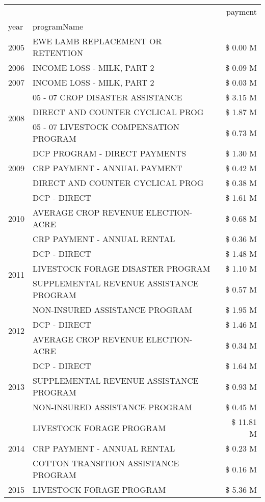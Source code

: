 \begin{tabular}{llr}
\toprule
 &  & payment \\
year & programName &  \\
\midrule
2005 & EWE LAMB REPLACEMENT OR RETENTION & \$ 0.00 M \\
\cline{1-3}
2006 & INCOME LOSS - MILK, PART 2 & \$ 0.09 M \\
\cline{1-3}
2007 & INCOME LOSS - MILK, PART 2 & \$ 0.03 M \\
\cline{1-3}
\multirow[t]{3}{*}{2008} & 05 - 07 CROP DISASTER ASSISTANCE & \$ 3.15 M \\
 & DIRECT AND COUNTER CYCLICAL PROG & \$ 1.87 M \\
 & 05 - 07 LIVESTOCK COMPENSATION PROGRAM & \$ 0.73 M \\
\cline{1-3}
\multirow[t]{3}{*}{2009} & DCP PROGRAM - DIRECT PAYMENTS & \$ 1.30 M \\
 & CRP PAYMENT - ANNUAL PAYMENT & \$ 0.42 M \\
 & DIRECT AND COUNTER CYCLICAL PROG & \$ 0.38 M \\
\cline{1-3}
\multirow[t]{3}{*}{2010} & DCP - DIRECT & \$ 1.61 M \\
 & AVERAGE CROP REVENUE ELECTION-ACRE & \$ 0.68 M \\
 & CRP PAYMENT - ANNUAL RENTAL & \$ 0.36 M \\
\cline{1-3}
\multirow[t]{3}{*}{2011} & DCP - DIRECT & \$ 1.48 M \\
 & LIVESTOCK FORAGE DISASTER PROGRAM & \$ 1.10 M \\
 & SUPPLEMENTAL REVENUE ASSISTANCE PROGRAM & \$ 0.57 M \\
\cline{1-3}
\multirow[t]{3}{*}{2012} & NON-INSURED ASSISTANCE PROGRAM & \$ 1.95 M \\
 & DCP - DIRECT & \$ 1.46 M \\
 & AVERAGE CROP REVENUE ELECTION-ACRE & \$ 0.34 M \\
\cline{1-3}
\multirow[t]{3}{*}{2013} & DCP - DIRECT & \$ 1.64 M \\
 & SUPPLEMENTAL REVENUE ASSISTANCE PROGRAM & \$ 0.93 M \\
 & NON-INSURED ASSISTANCE PROGRAM & \$ 0.45 M \\
\cline{1-3}
\multirow[t]{3}{*}{2014} & LIVESTOCK FORAGE PROGRAM & \$ 11.81 M \\
 & CRP PAYMENT - ANNUAL RENTAL & \$ 0.23 M \\
 & COTTON TRANSITION ASSISTANCE PROGRAM & \$ 0.16 M \\
\cline{1-3}
\multirow[t]{3}{*}{2015} & LIVESTOCK FORAGE PROGRAM & \$ 5.36 M \\

\end{tabular}
